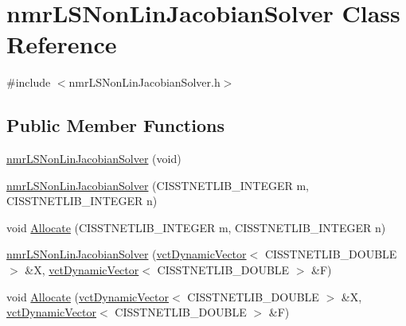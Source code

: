 \hypertarget{classnmr_l_s_non_lin_jacobian_solver}{}\section{nmr\+L\+S\+Non\+Lin\+Jacobian\+Solver Class Reference}
\label{classnmr_l_s_non_lin_jacobian_solver}


{\ttfamily \#include $<$nmr\+L\+S\+Non\+Lin\+Jacobian\+Solver.\+h$>$}

\subsection*{Public Member Functions}
\begin{DoxyCompactItemize}
\item 
\hyperlink{classnmr_l_s_non_lin_jacobian_solver_a82d63a80d629c6aa4f047dac4724b84a}{nmr\+L\+S\+Non\+Lin\+Jacobian\+Solver} (void)
\item 
\hyperlink{classnmr_l_s_non_lin_jacobian_solver_aebdaf37647beda47284a1bf14dedae28}{nmr\+L\+S\+Non\+Lin\+Jacobian\+Solver} (C\+I\+S\+S\+T\+N\+E\+T\+L\+I\+B\+\_\+\+I\+N\+T\+E\+G\+E\+R m, C\+I\+S\+S\+T\+N\+E\+T\+L\+I\+B\+\_\+\+I\+N\+T\+E\+G\+E\+R n)
\item 
void \hyperlink{classnmr_l_s_non_lin_jacobian_solver_aef5dc0d192cb834af119367a560c0b9f}{Allocate} (C\+I\+S\+S\+T\+N\+E\+T\+L\+I\+B\+\_\+\+I\+N\+T\+E\+G\+E\+R m, C\+I\+S\+S\+T\+N\+E\+T\+L\+I\+B\+\_\+\+I\+N\+T\+E\+G\+E\+R n)
\end{DoxyCompactItemize}
{\bf }\par
\begin{DoxyCompactItemize}
\item 
\hyperlink{classnmr_l_s_non_lin_jacobian_solver_ace5ac8424a60357e1d9c2160cbaa87b2}{nmr\+L\+S\+Non\+Lin\+Jacobian\+Solver} (\hyperlink{classvct_dynamic_vector}{vct\+Dynamic\+Vector}$<$ C\+I\+S\+S\+T\+N\+E\+T\+L\+I\+B\+\_\+\+D\+O\+U\+B\+L\+E $>$ \&X, \hyperlink{classvct_dynamic_vector}{vct\+Dynamic\+Vector}$<$ C\+I\+S\+S\+T\+N\+E\+T\+L\+I\+B\+\_\+\+D\+O\+U\+B\+L\+E $>$ \&F)
\end{DoxyCompactItemize}

{\bf }\par
\begin{DoxyCompactItemize}
\item 
void \hyperlink{classnmr_l_s_non_lin_jacobian_solver_a7b282bdda91e1067e30a793b364346fc}{Allocate} (\hyperlink{classvct_dynamic_vector}{vct\+Dynamic\+Vector}$<$ C\+I\+S\+S\+T\+N\+E\+T\+L\+I\+B\+\_\+\+D\+O\+U\+B\+L\+E $>$ \&X, \hyperlink{classvct_dynamic_vector}{vct\+Dynamic\+Vector}$<$ C\+I\+S\+S\+T\+N\+E\+T\+L\+I\+B\+\_\+\+D\+O\+U\+B\+L\+E $>$ \&F)
\end{DoxyCompactItemize}

